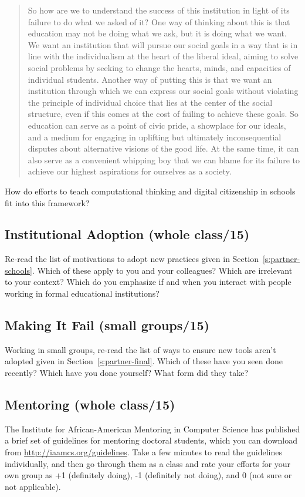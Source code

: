 \begin{quote}\setlength{\parindent}{0pt}
So how are we to understand the success of this institution in light
of its failure to do what we asked of it? One way of thinking about
this is that education may not be doing what we ask, but it is doing
what we want. We want an institution that will pursue our social goals
in a way that is in line with the individualism at the heart of the
liberal ideal, aiming to solve social problems by seeking to change
the hearts, minds, and capacities of individual students. Another way
of putting this is that we want an institution through which we can
express our social goals without violating the principle of individual
choice that lies at the center of the social structure, even if this
comes at the cost of failing to achieve these goals. So education can
serve as a point of civic pride, a showplace for our ideals, and a
medium for engaging in uplifting but ultimately inconsequential
disputes about alternative visions of the good life. At the same time,
it can also serve as a convenient whipping boy that we can blame for
its failure to achieve our highest aspirations for ourselves as a
society.
\end{quote}

How do efforts to teach computational thinking and digital citizenship
in schools fit into this framework?

\subsection{Institutional Adoption (whole class/15)}\label{institutional-adoption-whole-class15}

Re-read the list of motivations to adopt new practices given in
Section~\ref{s:partner-schools}. Which of these apply to you and your
colleagues? Which are irrelevant to your context? Which do you emphasize
if and when you interact with people working in formal educational
institutions?

\subsection{Making It Fail (small groups/15)}\label{making-it-fail-small-groups15}

Working in small groups, re-read the list of ways to ensure new tools
aren't adopted given in Section~\ref{s:partner-final}. Which of these
have you seen done recently? Which have you done yourself? What form did
they take?

\subsection{Mentoring (whole class/15)}\label{mentoring-whole-class15}

The Institute for African-American Mentoring in Computer Science has
published a brief set of guidelines for mentoring doctoral students,
which you can download from \url{http://iaamcs.org/guidelines}. Take a few
minutes to read the guidelines individually, and then go through them as
a class and rate your efforts for your own group as +1 (definitely
doing), -1 (definitely not doing), and 0 (not sure or not applicable).
